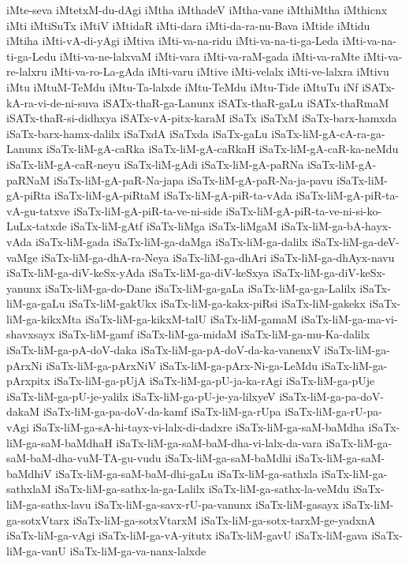 {iMte-seva
iMtetxM-du-dAgi
iMtha
iMthadeV
iMtha-vane
iMthiMtha
iMthicnx
iMti
iMtiSuTx
iMtiV
iMtidaR
iMti-dara
iMti-da-ra-nu-Bava
iMtide
iMtidu
iMtiha
iMti-vA-di-yAgi
iMtiva
iMti-va-na-ridu
iMti-va-na-ti-ga-Leda
iMti-va-na-ti-ga-Ledu
iMti-va-ne-lalxvaM
iMti-vara
iMti-va-raM-gada
iMti-va-raMte
iMti-va-re-lalxru
iMti-va-ro-La-gAda
iMti-varu
iMtive
iMti-velalx
iMti-ve-lalxra
iMtivu
iMtu
iMtuM-TeMdu
iMtu-Ta-lalxde
iMtu-TeMdu
iMtu-Tide
iMtuTu
iNf
iSATx-kA-ra-vi-de-ni-suva
iSATx-thaR-ga-Lanunx
iSATx-thaR-gaLu
iSATx-thaRmaM
iSATx-thaR-si-didhxya
iSATx-vA-pitx-karaM
iSaTx
iSaTxM
iSaTx-barx-hamxda
iSaTx-barx-hamx-dalilx
iSaTxdA
iSaTxda
iSaTx-gaLu
iSaTx-liM-gA-cA-ra-ga-Lanunx
iSaTx-liM-gA-caRka
iSaTx-liM-gA-caRkaH
iSaTx-liM-gA-caR-ka-neMdu
iSaTx-liM-gA-caR-neyu
iSaTx-liM-gAdi
iSaTx-liM-gA-paRNa
iSaTx-liM-gA-paRNaM
iSaTx-liM-gA-paR-Na-japa
iSaTx-liM-gA-paR-Na-ja-pavu
iSaTx-liM-gA-piRta
iSaTx-liM-gA-piRtaM
iSaTx-liM-gA-piR-ta-vAda
iSaTx-liM-gA-piR-ta-vA-gu-tatxve
iSaTx-liM-gA-piR-ta-ve-ni-side
iSaTx-liM-gA-piR-ta-ve-ni-si-ko-LuLx-tatxde
iSaTx-liM-gAtf
iSaTx-liMga
iSaTx-liMgaM
iSaTx-liM-ga-bA-hayx-vAda
iSaTx-liM-gada
iSaTx-liM-ga-daMga
iSaTx-liM-ga-dalilx
iSaTx-liM-ga-deV-vaMge
iSaTx-liM-ga-dhA-ra-Neya
iSaTx-liM-ga-dhAri
iSaTx-liM-ga-dhAyx-navu
iSaTx-liM-ga-diV-keSx-yAda
iSaTx-liM-ga-diV-keSxya
iSaTx-liM-ga-diV-keSx-yanunx
iSaTx-liM-ga-do-Dane
iSaTx-liM-ga-gaLa
iSaTx-liM-ga-ga-Lalilx
iSaTx-liM-ga-gaLu
iSaTx-liM-gakUkx
iSaTx-liM-ga-kakx-piRsi
iSaTx-liM-gakekx
iSaTx-liM-ga-kikxMta
iSaTx-liM-ga-kikxM-talU
iSaTx-liM-gamaM
iSaTx-liM-ga-ma-vi-shavxsayx
iSaTx-liM-gamf
iSaTx-liM-ga-midaM
iSaTx-liM-ga-mu-Ka-dalilx
iSaTx-liM-ga-pA-doV-daka
iSaTx-liM-ga-pA-doV-da-ka-vanenxV
iSaTx-liM-ga-pArxNi
iSaTx-liM-ga-pArxNiV
iSaTx-liM-ga-pArx-Ni-ga-LeMdu
iSaTx-liM-ga-pArxpitx
iSaTx-liM-ga-pUjA
iSaTx-liM-ga-pU-ja-ka-rAgi
iSaTx-liM-ga-pUje
iSaTx-liM-ga-pU-je-yalilx
iSaTx-liM-ga-pU-je-ya-lilxyeV
iSaTx-liM-ga-pa-doV-dakaM
iSaTx-liM-ga-pa-doV-da-kamf
iSaTx-liM-ga-rUpa
iSaTx-liM-ga-rU-pa-vAgi
iSaTx-liM-ga-sA-hi-tayx-vi-lalx-di-dadxre
iSaTx-liM-ga-saM-baMdha
iSaTx-liM-ga-saM-baMdhaH
iSaTx-liM-ga-saM-baM-dha-vi-lalx-da-vara
iSaTx-liM-ga-saM-baM-dha-vuM-TA-gu-vudu
iSaTx-liM-ga-saM-baMdhi
iSaTx-liM-ga-saM-baMdhiV
iSaTx-liM-ga-saM-baM-dhi-gaLu
iSaTx-liM-ga-sathxla
iSaTx-liM-ga-sathxlaM
iSaTx-liM-ga-sathx-la-ga-Lalilx
iSaTx-liM-ga-sathx-la-veMdu
iSaTx-liM-ga-sathx-lavu
iSaTx-liM-ga-savx-rU-pa-vanunx
iSaTx-liM-gasayx
iSaTx-liM-ga-sotxVtarx
iSaTx-liM-ga-sotxVtarxM
iSaTx-liM-ga-sotx-tarxM-ge-yadxnA
iSaTx-liM-ga-vAgi
iSaTx-liM-ga-vA-yitutx
iSaTx-liM-gavU
iSaTx-liM-gava
iSaTx-liM-ga-vanU
iSaTx-liM-ga-va-nanx-lalxde
}
